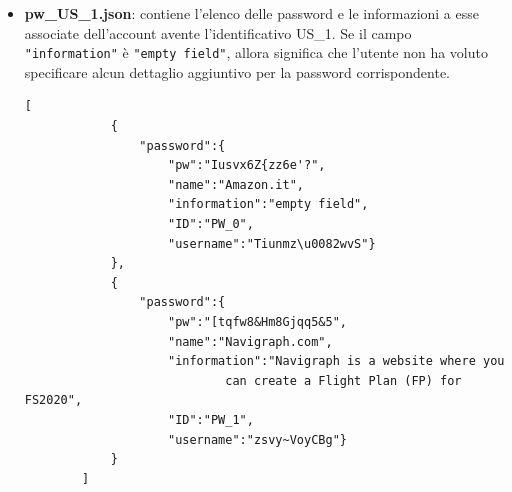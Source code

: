 \documentclass[a4paper, 12pt, one column, aas_macros]{article}
\begin{document}
\begin{itemize}
		\item \textbf{pw\_US\_1.json}: contiene l'elenco delle password e le informazioni a esse associate dell'account avente l'identificativo US\_1. Se il campo \verb|"information"| è \verb|"empty field"|, allora significa che l'utente non ha voluto specificare alcun dettaglio aggiuntivo per la password corrispondente. 
		\begin{Verbatim}[tabsize=1]
		[
			{
				"password":{
					"pw":"Iusvx6Z{zz6e'?",
					"name":"Amazon.it",
					"information":"empty field",
					"ID":"PW_0",
					"username":"Tiunmz\u0082wvS"}
			},
			{
				"password":{
					"pw":"[tqfw8&Hm8Gjqq5&5",
					"name":"Navigraph.com",
					"information":"Navigraph is a website where you 
							can create a Flight Plan (FP) for FS2020",
					"ID":"PW_1",
					"username":"zsvy~VoyCBg"}
			}
		]
		\end{Verbatim}
		
	
	\end{itemize}
\end{document}
